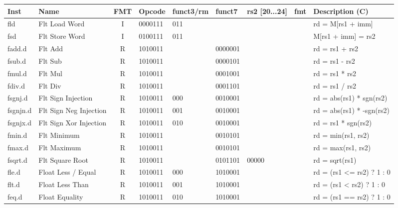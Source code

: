 \begin{center}
\begin{tabular}
{T | l | c | T | T | T | T | T | T } \hline
\rm Inst  & Name                  & FMT   & \rm Opcode & \rm funct3/rm & \rm funct7 & \rm rs2 [20...24] & \rm fmt & \rm Description (C)         \\ \hline
fld       & Flt Load Word         & I     & 0000111    & 011    &        &        & & rd = M[rs1 + imm]    \\
fsd       & Flt Store Word        & I     & 0100111    & 011    &        &        & & M[rs1 + imm] = rs2   \\
\hline
fadd.d    & Flt Add               & R     & 1010011    &        & 0000001 &        & & rd = rs1 + rs2       \\
fsub.d    & Flt Sub               & R     & 1010011    &        & 0000101 &        & & rd = rs1 - rs2       \\
fmul.d    & Flt Mul               & R     & 1010011    &        & 0001001 &        & & rd = rs1 * rs2       \\
fdiv.d    & Flt Div               & R     & 1010011    &        & 0001101 &        & & rd = rs1 / rs2       \\
fsgnj.d   & Flt Sign Injection    & R     & 1010011    & 000    & 0010001 &        & & rd = abs(rs1) * sgn(rs2) \\
fsgnjn.d  & Flt Sign Neg Injection& R     & 1010011    & 001    & 0010001 &        & & rd = abs(rs1) * -sgn(rs2) \\
fsgnjx.d  & Flt Sign Xor Injection& R     & 1010011    & 010    & 0010001 &        & & rd = rs1 * sgn(rs2)  \\
fmin.d    & Flt Minimum           & R     & 1010011    &        & 0010101 &        & & rd = min(rs1, rs2)   \\
fmax.d    & Flt Maximum           & R     & 1010011    &        & 0010101 &        & & rd = max(rs1, rs2)   \\
fsqrt.d   & Flt Square Root       & R     & 1010011    &        & 0101101 & 00000  & & rd = sqrt(rs1)       \\
\hline
fle.d     & Float Less / Equal    & R     & 1010011    & 000    & 1010001 &        & & rd = (rs1 <= rs2) ? 1 : 0\\
flt.d     & Float Less Than       & R     & 1010011    & 001    & 1010001 &        & & rd = (rs1 <  rs2) ? 1 : 0 \\
feq.d     & Float Equality        & R     & 1010011    & 010    & 1010001 &        & & rd = (rs1 == rs2) ? 1 : 0 \\

\end{tabular}
\end{center}
